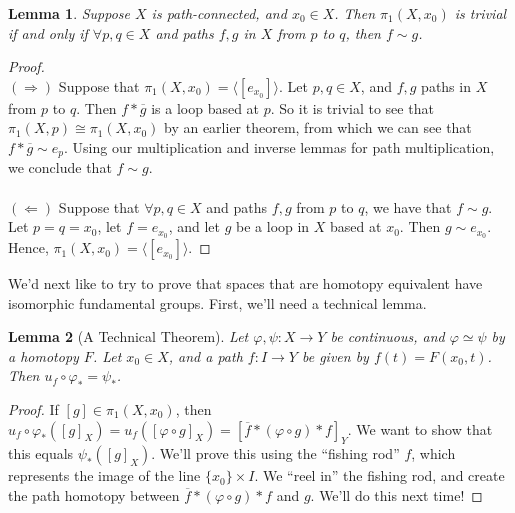 \documentclass{article}
\renewcommand{\phi}{\varphi}
\newtheorem{Lemma}{Lemma}
\theoremstyle{definition}
\begin{document}
\begin{Lemma}
Suppose $X$ is path-connected, and $x_0 \in X$. Then $\pi_1(X,x_0) $ is trivial if and only if $\forall p,q\in X$ and paths $f,g$  in $X$ from $p$ to $q$, then $f\sim g$. 
\end{Lemma}
\begin{proof} \text{}\\
$(\Rightarrow)$ Suppose that $\pi_1 (X,x_0) = \langle [e_{x_0} ] \rangle$. Let $p,q \in X$, and $f,g$ paths in $X$ from $p$ to $q$. Then $f\ast \overline{g}$ is a loop based at $p$. So it is trivial to see that $\pi_1 (X, p) \cong \pi_1 (X,x_0)$ by an earlier theorem, from which we can see that $f\ast \overline{g} \sim e_p$. Using our multiplication and inverse lemmas for path multiplication, we conclude that $f\sim g$. \\\\
$(\Leftarrow)$ Suppose that $\forall p,q \in X$ and paths $f,g$ from $p$ to $q$, we have that $f\sim g$. Let $p=q=x_0$, let $f = e_{x_0}$, and let $g$ be a loop in $X$ based at $x_0$. Then $g\sim e_{x_0}$. Hence, $\pi_1(X,x_0) = \langle [e_{x_0}] \rangle$. 
\end{proof}
We'd next like to try to prove that spaces that are homotopy equivalent have isomorphic fundamental groups. First, we'll need a technical lemma.
\begin{Lemma}[A Technical Theorem]
Let $\phi, \psi : X \to Y$ be continuous, and $\phi\simeq \psi$ by a homotopy $F$. Let $x_0 \in X$, and  a path $f:I \to Y$ be given by $f(t) = F(x_0,t)$. 
Then $u_f \circ \phi_\ast = \psi_\ast$. 
\end{Lemma}
\begin{proof}
If $[g]\in \pi_1 (X,x_0)$, then $u_f \circ \phi_\ast \left( [g]_X\right) = u_f ( [\phi \circ g]_X) = [\overline{f} \ast (\phi \circ g) \ast f ]_Y$. We want to show that this equals $\psi_\ast ([g]_X)$. We'll prove this using the ``fishing rod'' $f$, which represents the image of the line $\{x_0\} \times I$. We ``reel in'' the fishing rod, and create the path homotopy between $\overline{f} \ast (\phi \circ g) \ast f$ and $g$. We'll do this next time!

\end{proof}
\end{document}

